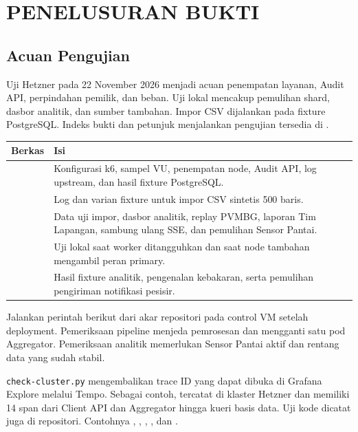 \chapter{PENELUSURAN BUKTI}
\label{app:evidence}

\section{Acuan Pengujian}
Uji Hetzner pada 22 November 2026 menjadi acuan penempatan layanan, Audit API, perpindahan pemilik, dan beban. Uji lokal mencakup pemulihan shard, dasbor analitik, dan sumber tambahan. Impor CSV dijalankan pada fixture PostgreSQL. Indeks bukti dan petunjuk menjalankan pengujian tersedia di .

{\small
\noindent\begin{tabularx}{\linewidth}{@{}lY@{}}
\toprule
Berkas & Isi \\
\midrule
{} & Konfigurasi k6, sampel VU, penempatan node, Audit API, log upstream, dan hasil fixture PostgreSQL. \\
 & Log dan varian fixture untuk impor CSV sintetis 500 baris. \\
 & Data uji impor, dasbor analitik, replay PVMBG, laporan Tim Lapangan, sambung ulang SSE, dan pemulihan Sensor Pantai. \\
 & Uji lokal saat worker ditangguhkan dan saat node tambahan mengambil peran primary. \\
 & Hasil fixture analitik, pengenalan kebakaran, serta pemulihan pengiriman notifikasi pesisir. \\
\bottomrule
\end{tabularx}
}

Jalankan perintah berikut dari akar repositori pada control VM setelah deployment. Pemeriksaan pipeline menjeda pemrosesan dan mengganti satu pod Aggregator. Pemeriksaan analitik memerlukan Sensor Pantai aktif dan rentang data yang sudah stabil.


\texttt{check-cluster.py} mengembalikan trace ID yang dapat dibuka di Grafana Explore melalui Tempo. Sebagai contoh,  tercatat di klaster Hetzner dan memiliki 14 span dari Client API dan Aggregator hingga kueri basis data. Uji kode dicatat juga di repositori. Contohnya , , , , dan .

